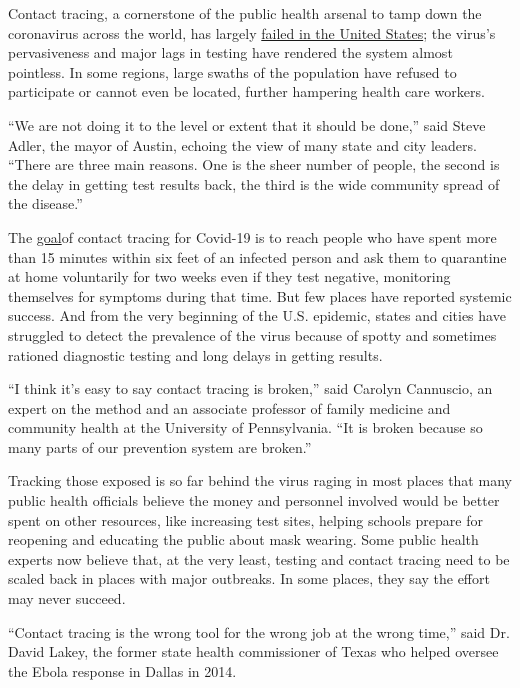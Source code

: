 Contact tracing, a cornerstone of the public health arsenal to tamp down
the coronavirus across the world, has largely
\href{https://www.nytimes3xbfgragh.onion/2020/08/06/us/united-states-failure-coronavirus.html}{failed
in the United States}; the virus's pervasiveness and major lags in
testing have rendered the system almost pointless. In some regions,
large swaths of the population have refused to participate or cannot
even be located, further hampering health care workers.

``We are not doing it to the level or extent that it should be done,''
said Steve Adler, the mayor of Austin, echoing the view of many state
and city leaders. ``There are three main reasons. One is the sheer
number of people, the second is the delay in getting test results back,
the third is the wide community spread of the disease.''

The
\href{https://www.cdc.gov/coronavirus/2019-ncov/php/contact-tracing/contact-tracing-plan/contact-tracing.html}{goal}of
contact tracing for Covid-19 is to reach people who have spent more than
15 minutes within six feet of an infected person and ask them to
quarantine at home voluntarily for two weeks even if they test negative,
monitoring themselves for symptoms during that time. But few places have
reported systemic success. And from the very beginning of the U.S.
epidemic, states and cities have struggled to detect the prevalence of
the virus because of spotty and sometimes rationed diagnostic testing
and long delays in getting results.

``I think it's easy to say contact tracing is broken,'' said Carolyn
Cannuscio, an expert on the method and an associate professor of family
medicine and community health at the University of Pennsylvania. ``It is
broken because so many parts of our prevention system are broken.''

Tracking those exposed is so far behind the virus raging in most places
that many public health officials believe the money and personnel
involved would be better spent on other resources, like increasing test
sites, helping schools prepare for reopening and educating the public
about mask wearing. Some public health experts now believe that, at the
very least, testing and contact tracing need to be scaled back in places
with major outbreaks. In some places, they say the effort may never
succeed.

``Contact tracing is the wrong tool for the wrong job at the wrong
time,'' said Dr. David Lakey, the former state health commissioner of
Texas who helped oversee the Ebola response in Dallas in 2014.


